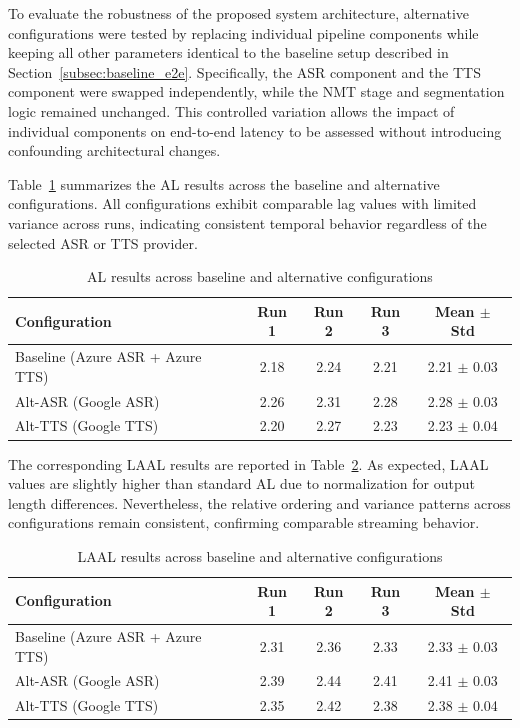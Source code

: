 To evaluate the robustness of the proposed system architecture, alternative configurations were tested by replacing individual pipeline components while keeping all other parameters identical to the baseline setup described in Section~\ref{subsec:baseline_e2e}. Specifically, the ASR component and the TTS component were swapped independently, while the NMT stage and segmentation logic remained unchanged. This controlled variation allows the impact of individual components on end-to-end latency to be assessed without introducing confounding architectural changes.

Table~\ref{tab:al_all_configs} summarizes the AL results across the baseline and alternative configurations. All configurations exhibit comparable lag values with limited variance across runs, indicating consistent temporal behavior regardless of the selected ASR or TTS provider.

\begin{table}[!htbp]
\centering
\caption[Average Lagging across configurations]{AL results across baseline and alternative configurations}
\label{tab:al_all_configs}
\begin{tabular}{lcccc}
\toprule
\textbf{Configuration} & \textbf{Run 1} & \textbf{Run 2} & \textbf{Run 3} & \textbf{Mean $\pm$ Std} \\
\midrule
Baseline (Azure ASR + Azure TTS) & 2.18 & 2.24 & 2.21 & 2.21 $\pm$ 0.03 \\
Alt-ASR (Google ASR)             & 2.26 & 2.31 & 2.28 & 2.28 $\pm$ 0.03 \\
Alt-TTS (Google TTS)             & 2.20 & 2.27 & 2.23 & 2.23 $\pm$ 0.04 \\
\bottomrule
\end{tabular}
\end{table}

The corresponding LAAL results are reported in Table~\ref{tab:laal_all_configs}. As expected, LAAL values are slightly higher than standard AL due to normalization for output length differences. Nevertheless, the relative ordering and variance patterns across configurations remain consistent, confirming comparable streaming behavior.

\begin{table}[!htbp]
\centering
\caption[Length-Adaptive Average Lagging across configurations]{LAAL results across baseline and alternative configurations}
\label{tab:laal_all_configs}
\begin{tabular}{lcccc}
\toprule
\textbf{Configuration} & \textbf{Run 1} & \textbf{Run 2} & \textbf{Run 3} & \textbf{Mean $\pm$ Std} \\
\midrule
Baseline (Azure ASR + Azure TTS) & 2.31 & 2.36 & 2.33 & 2.33 $\pm$ 0.03 \\
Alt-ASR (Google ASR)             & 2.39 & 2.44 & 2.41 & 2.41 $\pm$ 0.03 \\
Alt-TTS (Google TTS)             & 2.35 & 2.42 & 2.38 & 2.38 $\pm$ 0.04 \\
\bottomrule
\end{tabular}
\end{table}

